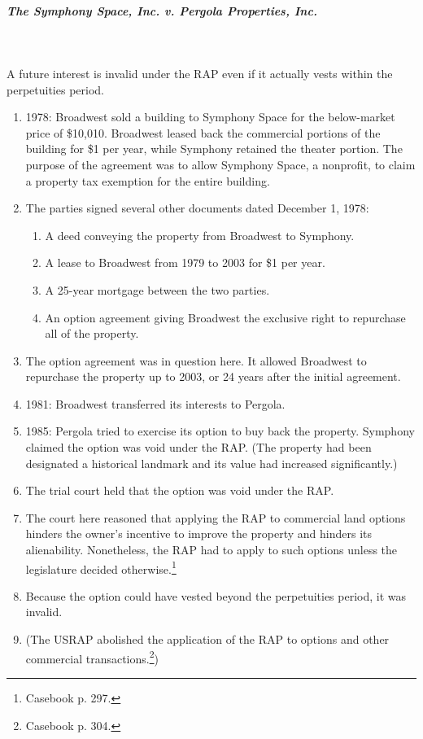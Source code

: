 \paragraph{\emph{The Symphony Space, Inc. v. Pergola Properties, Inc.}}
~\\\\
A future interest is invalid under the RAP even if it actually vests within 
the perpetuities period.

\begin{enumerate}
    \item 1978: Broadwest sold a building to Symphony Space for the 
    below-market price of \$10,010. Broadwest leased back the commercial 
    portions of the building for \$1 per year, while Symphony retained the 
    theater portion. The purpose of the agreement was to allow Symphony 
    Space, a nonprofit, to claim a property tax exemption for the entire 
    building.
    \item The parties signed several other documents dated December 1, 1978:
    \begin{enumerate}
        \item A deed conveying the property from Broadwest to Symphony.
        \item A lease to Broadwest from 1979 to 2003 for \$1 per year.
        \item A 25-year mortgage between the two parties.
        \item An option agreement giving Broadwest the exclusive right to 
        repurchase all of the property.
    \end{enumerate}
    \item The option agreement was in question here. It allowed Broadwest to 
    repurchase the property up to 2003, or 24 years after the initial 
    agreement.
    \item 1981: Broadwest transferred its interests to Pergola.
    \item 1985: Pergola tried to exercise its option to buy back the property. 
    Symphony claimed the option was void under the RAP. (The property had been 
    designated a historical landmark and its value had increased 
    significantly.)
    \item The trial court held that the option was void under the RAP.
    \item The court here reasoned that applying the RAP to commercial land 
    options hinders the owner's incentive to improve the property and hinders 
    its alienability. Nonetheless, the RAP had to apply to such 
    options unless the legislature decided otherwise.\footnote{Casebook p. 
    297.}
    \item Because the option could have vested beyond the perpetuities period, 
    it was invalid.
    \item (The USRAP abolished the application of the RAP to options and other 
    commercial transactions.\footnote{Casebook p. 304.})
\end{enumerate}


